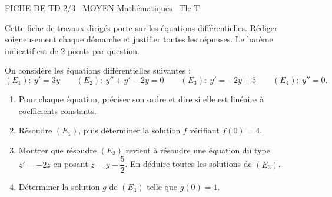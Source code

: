 \documentclass[11pt]{article}
\begin{document}
\begin{tcolorbox}[enhanced,colback=popink,colframe=popink,arc=10pt,boxrule=0pt,left=12pt,right=12pt,top=9pt,bottom=9pt]
{\color{white}\popxbold\small FICHE DE TD 2/3 \textbullet\ MOYEN \hfill Mathématiques \textbullet\ Tle T\par}
\end{tcolorbox}
\vspace{4pt}
Cette fiche de travaux dirigés porte sur les équations différentielles. Rédiger soigneusement chaque démarche et justifier toutes les réponses. Le barème indicatif est de 2 points par question.

\begin{exercice}
On considère les équations différentielles suivantes :
\[
(E_1):\ y'=3y \qquad (E_2):\ y''+y'-2y=0 \qquad (E_3):\ y'=-2y+5 \qquad (E_4):\ y''=0.
\]
\begin{enumerate}
\item Pour chaque équation, préciser son ordre et dire si elle est linéaire à coefficients constants.
\item Résoudre $(E_1)$, puis déterminer la solution $f$ vérifiant $f(0)=4$.
\item Montrer que résoudre $(E_3)$ revient à résoudre une équation du type $z'=-2z$ en posant $z=y-\dfrac{5}{2}$. En déduire toutes les solutions de $(E_3)$.
\item Déterminer la solution $g$ de $(E_3)$ telle que $g(0)=1$.
\end{enumerate}
\end{exercice}
\end{document}
